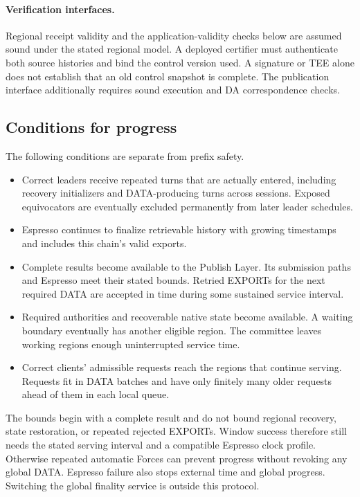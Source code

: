 \paragraph{Verification interfaces.}
Regional receipt validity and the application-validity checks below
are assumed sound under the stated regional model. A deployed
certifier must authenticate both source histories and bind the control
version used. A signature or TEE alone does not establish that an old
control snapshot is complete. The publication interface additionally
requires sound execution and DA correspondence checks.

\subsection{Conditions for progress}
\label{sec:progress}
The following conditions are separate from prefix safety.
\begin{itemize}
\item Correct leaders receive repeated turns that are actually entered,
including recovery initializers and DATA-producing turns across
sessions. Exposed equivocators are eventually excluded permanently
from later leader schedules.
\item Espresso continues to finalize retrievable history with growing
timestamps and includes this chain's valid exports.
\item Complete results become available to the Publish Layer. Its
submission paths and Espresso meet their stated bounds. Retried EXPORTs
for the next required DATA are accepted in time during some sustained
service interval.
\item Required authorities and recoverable native state become
available. A waiting boundary eventually has another eligible region.
The committee leaves working regions enough uninterrupted service time.
\item Correct clients' admissible requests reach the regions that
continue serving. Requests fit in DATA batches and have only finitely
many older requests ahead of them in each local queue.
\end{itemize}
The bounds begin with a complete result and do not bound regional
recovery, state restoration, or repeated rejected EXPORTs. Window success
therefore still needs the stated serving interval and a compatible
Espresso clock profile. Otherwise repeated automatic Forces can prevent
progress without revoking any global DATA. Espresso failure also stops external time and
global progress. Switching the global finality service is outside this
protocol.

